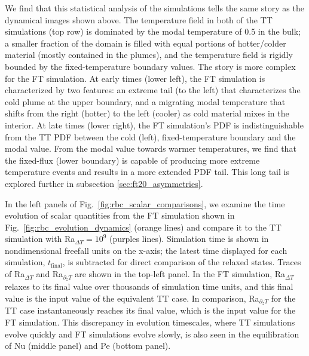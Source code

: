 We find that this statistical analysis of the simulations tells the same story as the dynamical images shown above.
The temperature field in both of the TT simulations (top row) is dominated by the modal temperature of 0.5 in the bulk; a smaller fraction of the domain is filled with equal portions of hotter/colder material (mostly contained in the plumes), and the temperature field is rigidly bounded by the fixed-temperature boundary values.
The story is more complex for the FT simulation.
At early times (lower left), the FT simulation is characterized by two features: an extreme tail (to the left) that characterizes the cold plume at the upper boundary, and a migrating modal temperature that shifts from the right (hotter) to the left (cooler) as cold material mixes in the interior.
At late times (lower right), the FT simulation's PDF is indistinguishable from the TT PDF between the cold (left), fixed-temperature boundary and the modal value.
From the modal value towards warmer temperatures, we find that the fixed-flux (lower boundary) is capable of producing more extreme temperature events and results in a more extended PDF tail.
This long tail is explored further in subsection \ref{sec:ft20_asymmetries}.

In the left panels of Fig.~\ref{fig:rbc_scalar_comparisons}, we examine the time evolution of scalar quantities from the FT simulation shown in Fig.~\ref{fig:rbc_evolution_dynamics} (orange lines) and compare it to the TT simulation with Ra$_{\Delta T} = 10^9$ (purples lines).
Simulation time is shown in nondimensional freefall units on the x-axis; the latest time displayed for each simulation, $t_{\text{final}}$, is subtracted for direct comparison of the relaxed states.
Traces of Ra$_{\Delta T}$ and Ra$_{\partial_z T}$ are shown in the top-left panel.
In the FT simulation, Ra$_{\Delta T}$ relaxes to its final value over thousands of simulation time units, and this final value is the input value of the equivalent TT case.
In comparison, Ra$_{\partial_z T}$ for the TT case instantaneously reaches its final value, which is the input value for the FT simulation.
This discrepancy in evolution timescales, where TT simulations evolve quickly and FT simulations evolve slowly, is also seen in the equilibration of Nu (middle panel) and Pe (bottom panel).

